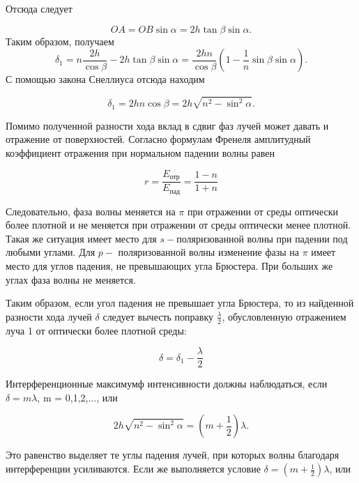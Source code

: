 Отсюда следует

 \begin{equation*}
     OA = OB\sin\alpha = 2h\tan\beta\sin\alpha .
 \end{equation*}
Таким образом, получаем
 \begin{equation*}
     \delta_1 = n\frac{2h}{\cos\beta} - 2h\tan\beta\sin\alpha = \frac{2hn}{\cos\beta}\left(1 - \frac{1}{n}\sin\beta\sin\alpha\right).
 \end{equation*}
С помощью закона Снеллиуса отсюда находим


 \begin{equation*}
    \delta_1 = 2hn\cos\beta = 2h\sqrt{n^2 - \sin^2\alpha}.
 \end{equation*}


Помимо полученной разности хода вклад в сдвиг фаз лучей может давать и отражение от поверхностей. Согласно формулам Френеля амплитудный коэффициент отражения при нормальном падении волны равен

\begin{equation*}
    r = \frac{E_{\text{отр}}}{E_{\text{пад}}} = \frac{1-n}{1+n}
\end{equation*}
 
 
 Следовательно, фаза волны меняется на $\pi $ при отражении от среды оптически более плотной и не меняется при отражении от среды оптически менее плотной. Такая же ситуация имеет место для $s-$поляризованной волны при падении под любыми углами. Для $p-$ поляризованной волны изменение фазы на $\pi$ имеет место для углов падения, не превышающих угла Брюстера. При больших же углах фаза волны не меняется.
 
 Таким образом, если угол падения не превышает угла Брюстера, то из найденной разности хода лучей $\delta$ следует вычесть поправку $\frac{\lambda}{2}$, обусловленную отражением луча 1 от оптически более плотной среды:
 
 \begin{equation*}
     \delta = \delta_1 - \frac{\lambda}{2}
 \end{equation*}
 
 Интерференционные максимумф интенсивности должны наблюдаться, если $\delta = m\lambda$, m = 0,1,2,..., или
 
\begin{equation*}
    2h\sqrt{n^2- \sin^2\alpha} = \left(m+\frac{1}{2}\right)\lambda .
\end{equation*}

Это равенство выделяет те углы падения лучей, при которых волны благодаря интерференции усиливаются. Если же выполняется условие $\delta = \left(m+\frac{1}{2}\right)\lambda$, или

